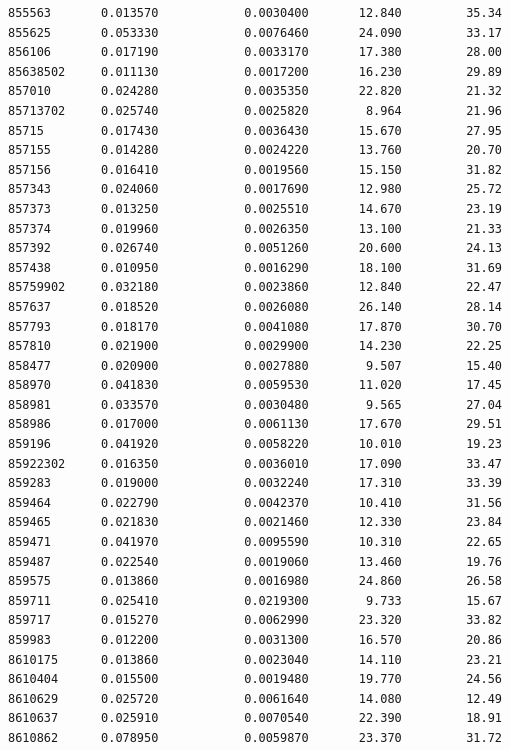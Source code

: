 \documentclass[
  letterpaper,
  DIV=11,
  numbers=noendperiod]{scrartcl}
\begin{document}
\begin{verbatim}
855563       0.013570            0.0030400       12.840         35.34
855625       0.053330            0.0076460       24.090         33.17
856106       0.017190            0.0033170       17.380         28.00
85638502     0.011130            0.0017200       16.230         29.89
857010       0.024280            0.0035350       22.820         21.32
85713702     0.025740            0.0025820        8.964         21.96
85715        0.017430            0.0036430       15.670         27.95
857155       0.014280            0.0024220       13.760         20.70
857156       0.016410            0.0019560       15.150         31.82
857343       0.024060            0.0017690       12.980         25.72
857373       0.013250            0.0025510       14.670         23.19
857374       0.019960            0.0026350       13.100         21.33
857392       0.026740            0.0051260       20.600         24.13
857438       0.010950            0.0016290       18.100         31.69
85759902     0.032180            0.0023860       12.840         22.47
857637       0.018520            0.0026080       26.140         28.14
857793       0.018170            0.0041080       17.870         30.70
857810       0.021900            0.0029900       14.230         22.25
858477       0.020900            0.0027880        9.507         15.40
858970       0.041830            0.0059530       11.020         17.45
858981       0.033570            0.0030480        9.565         27.04
858986       0.017000            0.0061130       17.670         29.51
859196       0.041920            0.0058220       10.010         19.23
85922302     0.016350            0.0036010       17.090         33.47
859283       0.019000            0.0032240       17.310         33.39
859464       0.022790            0.0042370       10.410         31.56
859465       0.021830            0.0021460       12.330         23.84
859471       0.041970            0.0095590       10.310         22.65
859487       0.022540            0.0019060       13.460         19.76
859575       0.013860            0.0016980       24.860         26.58
859711       0.025410            0.0219300        9.733         15.67
859717       0.015270            0.0062990       23.320         33.82
859983       0.012200            0.0031300       16.570         20.86
8610175      0.013860            0.0023040       14.110         23.21
8610404      0.015500            0.0019480       19.770         24.56
8610629      0.025720            0.0061640       14.080         12.49
8610637      0.025910            0.0070540       22.390         18.91
8610862      0.078950            0.0059870       23.370         31.72

\end{verbatim}
\end{document}
